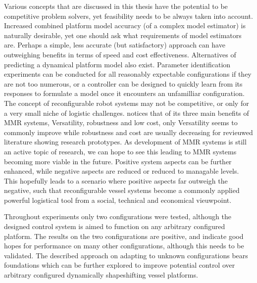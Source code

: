 Various concepts that are discussed in this thesis have the potential to be competitive problem solvers, yet feasibility needs to be always taken into account.
Increased combined platform model accuracy (of a complex model estimator) is naturally desirable, yet one should ask what requirements of model estimators are. Perhaps a simple, less accurate (but satisfactory) approach can have outweighing benefits in terms of speed and cost effectiveness. Alternatives of predicting a dynamical platform model also exist. Parameter identification experiments can be conducted for all reasonably expectable configurations if they are not too numerous, or a controller can be designed to quickly learn from its responses to formulate a model once it encounters an unfamilliar configuration. 
The concept of reconfigurable robot systems may not be competitive, or only for a very small niche of logistic challenges. \citet{seo2019modular} notices that of its three main benefits of MMR systems, Versatility, robustness and low cost, only Versatility seems to commonly improve while robustness and cost are usually decreasing for revieuwed literature showing research prototypes. As development of MMR systems is still an active topic of research, we can hope to see this leading to MMR systems becoming more viable in the future. Positive system aspects can be further enhanced, while negative aspects are reduced or reduced to managable levels. This hopefully leads to a scenario where positive aspects far outweigh the negative, such that reconfigurable vessel systems become a commonly applied powerful logistical tool from a social, technical and economical vieuwpoint. 



Throughout experiments only two configurations were tested, although the designed control system is aimed to function on any arbitrary configured platform. The results on the two configurations are positive, and indicate good hopes for performance on many other configurations, although this needs to be validated. The described approach on adapting to unknown configurations bears foundations which can be further explored to improve potential control over arbitrary configured dynamically shapeshifting vessel platforms. 


